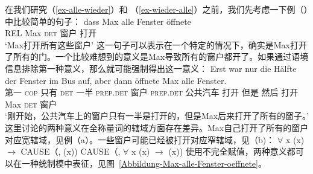 在我们研究（\ref{ex-alle-wieder}）和 （\ref{ex-wieder-alle}）之前，我们先考虑一下例（）中比较简单的句子：
\ea
\gll dass Max alle Fenster öffnete\\
	 REL Max \textsc{det} 窗户 打开\\
\glt `Max打开所有这些窗户'
\z
这一句子可以表示在一个特定的情况下，确实是Max打开了所有的门。一个比较难想到的意义是Max导致所有的窗户都开了。如果通过语境信息排除第一种意义，那么就可能强制得出这一意义\citep{Egg99a}：
\ea
\gll Erst war nur die Hälfte der Fenster im Bus auf, aber dann öffnete Max alle Fenster.\\
     第一 \textsc{cop} 只有 \textsc{det} 一半 \textsc{prep}.\textsc{det} 窗户 \textsc{prep}.\textsc{det} 公共汽车 打开 但是 然后 打开 Max \textsc{det} 窗户\\
\glt `刚开始，公共汽车上的窗户只有一半是打开的，但是Max后来打开了所有的窗子。'
\z
这里讨论的两种意义在全称量词的辖域方面存在差异。Max自己打开了所有的窗户对应宽辖域，见例（a）。一些窗户可能已经被打开对应窄辖域，见（b)：
\eal
\ex $\forall$ x (x) $\to$ CAUSE（, (x))
\ex CAUSE（, $\forall$ x (x) $\to$ (x))
\zl
使用不完全赋值，两种意义都可以在一种统制模中表征，见图~\vref{Abbildung-Max-alle-Fenster-oeffnete}。
